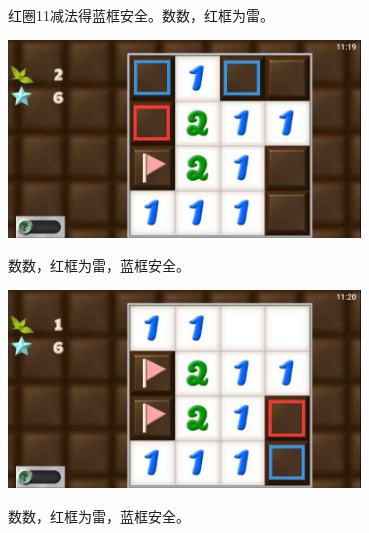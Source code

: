 红圈11减法得蓝框安全。数数，红框为雷。
\begin{center}
    \includegraphics[width=0.7\textwidth]{puzzlelow/21-5.jpg}
\end{center}
数数，红框为雷，蓝框安全。
\begin{center}
    \includegraphics[width=0.7\textwidth]{puzzlelow/21-6.jpg}
\end{center}
数数，红框为雷，蓝框安全。

